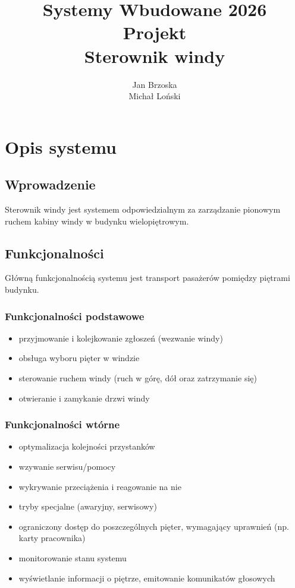 \documentclass[a4paper,12pt]{article}
\title{Systemy Wbudowane 2026 \\ Projekt \\ Sterownik windy}
\author{Jan Brzoska \\ Michał Loński}
\date{}
\begin{document}
\maketitle
\renewcommand{\contentsname}{Spis treści}
\tableofcontents
\pagebreak
\renewcommand{\arraystretch}{1.5}
\section{Opis systemu}

\subsection{Wprowadzenie}
Sterownik windy jest systemem odpowiedzialnym za zarządzanie pionowym ruchem kabiny windy w budynku wielopiętrowym.
\subsection{Funkcjonalności}
Główną funkcjonalnością systemu jest transport pasażerów pomiędzy piętrami budynku.
\subsubsection{Funkcjonalności podstawowe}
\begin{itemize}
    \item przyjmowanie i kolejkowanie zgłoszeń (wezwanie windy)
    \item obsługa wyboru pięter w windzie
    \item sterowanie ruchem windy (ruch w górę, dół oraz zatrzymanie się)
    \item otwieranie i zamykanie drzwi windy
\end{itemize}
\subsubsection{Funkcjonalności wtórne}
\begin{itemize}
    \item optymalizacja kolejności przystanków
    \item wzywanie serwisu/pomocy
    \item wykrywanie przeciążenia i reagowanie na nie
    \item tryby specjalne (awaryjny, serwisowy)
    \item ograniczony dostęp do poszczególnych pięter, wymagający uprawnień (np. karty pracownika)
    \item monitorowanie stanu systemu
    \item wyświetlanie informacji o piętrze, emitowanie komunikatów głosowych
\end{itemize}
\end{document}
